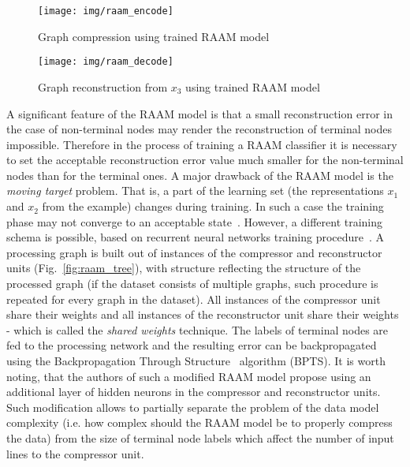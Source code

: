 \begin{figure}
\begin{center}
	\texttt{[image: img/raam\_encode]}
	\caption{Graph compression using trained RAAM model}
	\label{fig:raam_compression}
\end{center}
\end{figure}

\begin{figure}
\begin{center}
	\texttt{[image: img/raam\_decode]}
	\caption{Graph reconstruction from $x_3$ using trained RAAM model}
	\label{fig:raam_reconstruction}
\end{center}
\end{figure}



A significant feature of the RAAM model is that a small reconstruction error in the case of non-terminal nodes may render the reconstruction of terminal nodes impossible. Therefore in the process of training a RAAM classifier it is necessary to set the acceptable reconstruction error value much smaller for the non-terminal nodes than for the terminal ones. A major drawback of the RAAM model is the \emph{moving target} problem. That is, a part of the learning set (the representations $x_1$ and $x_2$ from the example) changes during training. In such a case the training phase may not converge to an acceptable state~\cite{goulon2005hopfield}. However, a different training schema is possible, based on recurrent neural networks training procedure~\cite{goulon2005hopfield}. A processing graph is built out of instances of the compressor and reconstructor units (Fig.~\ref{fig:raam_tree}), with structure reflecting the structure of the processed graph (if the dataset consists of multiple graphs, such procedure is repeated for every graph in the dataset). All instances of the compressor unit share their weights and all instances of the reconstructor unit share their weights - which is called the \emph{shared weights} technique. The labels of terminal nodes are fed to the processing network and the resulting error can be backpropagated using the Backpropagation Through Structure~\cite{kuchler1996inductive} algorithm (BPTS). It is worth noting, that the authors of such a modified RAAM model propose using an additional layer of hidden neurons in the compressor and reconstructor units. Such modification allows to partially separate the problem of the data model complexity (i.e. how complex should the RAAM model be to properly compress the data) from the size of terminal node labels which affect the number of input lines to the compressor unit.

